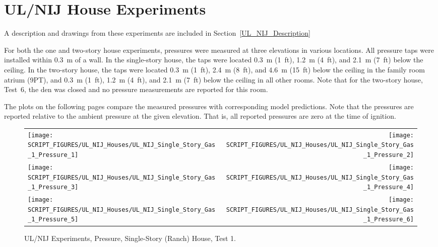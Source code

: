 \clearpage

\section{UL/NIJ House Experiments}

A description and drawings from these experiments are included in Section~\ref{UL_NIJ_Description}

For both the one and two-story house experiments, pressures were measured at three elevations in various locations. All pressure taps were installed within 0.3~m of a wall. In the single-story house, the taps were located 0.3~m (1~ft), 1.2~m (4~ft), and 2.1~m (7~ft) below the ceiling. In the two-story house, the taps were located 0.3~m (1~ft), 2.4~m (8~ft), and 4.6~m (15~ft) below the ceiling in the family room atrium (9PT), and 0.3~m (1~ft), 1.2~m (4~ft), and 2.1~m (7~ft) below the ceiling in all other rooms. Note that for the two-story house, Test~6, the den was closed and no pressure measurements are reported for this room.

The plots on the following pages compare the measured pressures with corresponding model predictions. Note that the pressures are reported relative to the ambient pressure at the given elevation. That is, all reported pressures are zero at the time of ignition.

\newpage

\begin{figure}[p]
\begin{tabular*}{\textwidth}{l@{\extracolsep{\fill}}r}
\texttt{[image: SCRIPT\_FIGURES/UL\_NIJ\_Houses/UL\_NIJ\_Single\_Story\_Gas\_1\_Pressure\_1]} &
\texttt{[image: SCRIPT\_FIGURES/UL\_NIJ\_Houses/UL\_NIJ\_Single\_Story\_Gas\_1\_Pressure\_2]} \\
\texttt{[image: SCRIPT\_FIGURES/UL\_NIJ\_Houses/UL\_NIJ\_Single\_Story\_Gas\_1\_Pressure\_3]} &
\texttt{[image: SCRIPT\_FIGURES/UL\_NIJ\_Houses/UL\_NIJ\_Single\_Story\_Gas\_1\_Pressure\_4]} \\
\texttt{[image: SCRIPT\_FIGURES/UL\_NIJ\_Houses/UL\_NIJ\_Single\_Story\_Gas\_1\_Pressure\_5]} &
\texttt{[image: SCRIPT\_FIGURES/UL\_NIJ\_Houses/UL\_NIJ\_Single\_Story\_Gas\_1\_Pressure\_6]} \\
\end{tabular*}
\caption[UL/NIJ Experiments, Pressure, Single-Story (Ranch) House, Test 1]{UL/NIJ Experiments, Pressure, Single-Story (Ranch) House, Test 1.}
\label{UL_NIJ_Pres_Ranch_1}
\end{figure}

